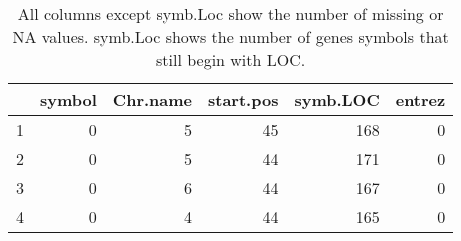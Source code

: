 \documentclass[letterpaper,12pt]{article}
\numberwithin{equation}{appendix}
\begin{document}
\noindent

{\small {
\begin{table}[ht]
\centering
\begin{tabular}{rrrrrr}
  \hline
 & symbol & Chr.name & start.pos & symb.LOC & entrez \\ 
  \hline
1 &   0 &   5 &  45 & 168 &   0 \\ 
  2 &   0 &   5 &  44 & 171 &   0 \\ 
  3 &   0 &   6 &  44 & 167 &   0 \\ 
  4 &   0 &   4 &  44 & 165 &   0 \\ 
   \hline
\end{tabular}
\caption{All columns except symb.Loc show the number of missing or NA values.
 symb.Loc shows the number of genes symbols that still begin with LOC.} 
\end{table}
}}
\end{document}
